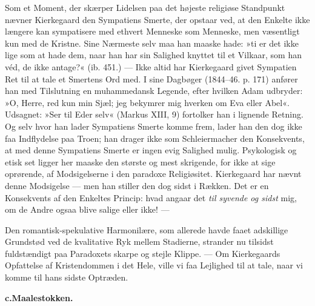 \documentclass[12pt,a4paper,openany]{book}
\newcommand{\opage}[1]{\marginnote{\footnotesize\textit{[#1]}}}
\begin{document}
Som et Moment, der skærper Lidelsen paa det højeste
religiøse Standpunkt nævner Kierkegaard den Sympatiens
Smerte, der opstaar ved, at den Enkelte ikke længere
kan sympatisere med ethvert Menneske som Menneske,
men væsentligt kun med de Kristne. Sine Nærmeste
selv maa han maaske hade: »ti er det ikke lige som at
hade dem, naar han har sin Salighed knyttet til et Vilkaar,
som han véd, de ikke antage?« (ib. 451.) --- Ikke
altid har Kierkegaard givet Sympatien Ret til at tale et
Smertens Ord med. I sine Dagbøger (1844--46. p. 171)
anfører han med Tilslutning en muhammedansk Legende,
\opage{119}efter hvilken Adam udbryder: »O, Herre, red kun min
Sjæl; jeg bekymrer mig hverken om Eva eller Abel«.
Udsagnet: »Ser til Eder selv« (Markus XIII, 9) fortolker
han i lignende Retning. Og selv hvor han lader
Sympatiens Smerte komme frem, lader han den dog
ikke faa Indflydelse paa Troen; han drager ikke som
Schleiermacher den Konsekvents, at med denne Sympatiens
Smerte er ingen evig Salighed mulig. Psykologisk og
etisk set ligger her maaske den største og mest skrigende,
for ikke at sige oprørende, af Modsigelserne i den paradoxe
Religiøsitet. Kierkegaard har nævnt denne Modsigelse
--- men han stiller den dog sidst i Rækken. Det
er en Konsekvents af den Enkeltes Princip: hvad angaar
det \textit{til syvende og sidst} mig, om de Andre ogsaa blive
salige eller ikke! ---

Den romantisk-spekulative Harmonilære, som allerede
havde faaet adskillige Grundstød ved de kvalitative Ryk
mellem Stadierne, strander nu tilsidst fuldstændigt paa
Paradoxets skarpe og stejle Klippe. --- Om Kierkegaards
Opfattelse af Kristendommen i det Hele, ville vi faa
Lejlighed til at tale, naar vi komme til hans sidste Optræden.

\begin{center}\textbf{c.\enspace Maalestokken.}\end{center}
\end{document}
